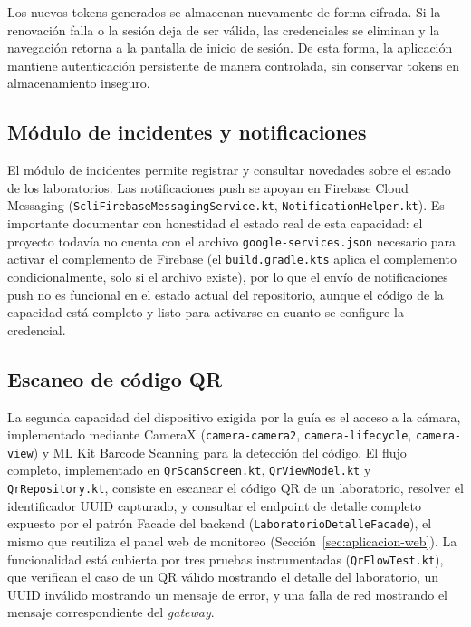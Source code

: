 Los nuevos tokens generados se almacenan nuevamente de forma cifrada. Si
la renovación falla o la sesión deja de ser válida, las credenciales se
eliminan y la navegación retorna a la pantalla de inicio de sesión. De esta
forma, la aplicación mantiene autenticación persistente de manera controlada,
sin conservar tokens en almacenamiento inseguro.

\subsection{Módulo de incidentes y notificaciones}

El módulo de incidentes permite registrar y consultar novedades sobre
el estado de los laboratorios. Las notificaciones push se apoyan en
Firebase Cloud Messaging (\texttt{ScliFirebaseMessagingService.kt},
\texttt{NotificationHelper.kt}). Es importante documentar con
honestidad el estado real de esta capacidad: el proyecto todavía no
cuenta con el archivo \texttt{google-services.json} necesario para
activar el complemento de Firebase (el \texttt{build.gradle.kts}
aplica el complemento condicionalmente, solo si el archivo existe), por
lo que el envío de notificaciones push no es funcional en el estado
actual del repositorio, aunque el código de la capacidad está
completo y listo para activarse en cuanto se configure la credencial.

\subsection{Escaneo de código QR}

La segunda capacidad del dispositivo exigida por la guía es el acceso
a la cámara, implementado mediante CameraX
(\texttt{camera-camera2}, \texttt{camera-lifecycle}, \texttt{camera-view})
y ML Kit Barcode Scanning para la detección del código. El flujo
completo, implementado en \texttt{QrScanScreen.kt},
\texttt{QrViewModel.kt} y \texttt{QrRepository.kt}, consiste en
escanear el código QR de un laboratorio, resolver el identificador
UUID capturado, y consultar el endpoint de detalle completo expuesto
por el patrón Facade del backend (\texttt{LaboratorioDetalleFacade}),
el mismo que reutiliza el panel web de monitoreo
(Sección~\ref{sec:aplicacion-web}). La funcionalidad está cubierta por
tres pruebas instrumentadas (\texttt{QrFlowTest.kt}), que verifican el
caso de un QR válido mostrando el detalle del laboratorio, un UUID
inválido mostrando un mensaje de error, y una falla de red mostrando
el mensaje correspondiente del \emph{gateway}.

